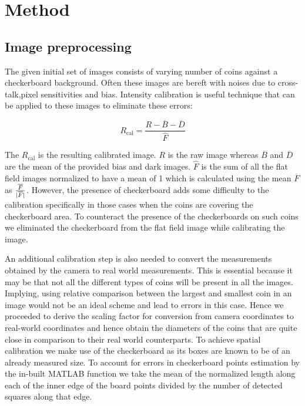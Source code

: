 \documentclass[report.tex]{subfile}
\begin{document}
\section{Method}

\subsection{Image preprocessing}
The given initial set of images consists of varying number of coins against a
checkerboard background. Often these images are bereft with noises due to
cross-talk,pixel sensitivities and bias. Intensity calibration is useful
technique that can be applied to these images to eliminate these errors:

\begin{equation*}
    R_{\textrm{cal}} = \frac{R - \overline{B} - \overline{D}}{\hat{F}}
\end{equation*}

The $R_{\textrm{cal}}$ is the resulting calibrated image. $R$ is the raw image
whereas $\overline{B}$ and $\overline{D}$ are the mean of the provided bias and
dark images. $\hat{F}$ is the sum of all the flat field images normalized to
have a mean of 1 which is calculated using the mean $\overline{F}$ as
$\frac{\overline{F}}{\lvert\overline{F}\rvert}$. However, the presence of
checkerboard adds some difficulty to the calibration specifically in those
cases when the coins are covering the checkerboard area. To counteract the
presence of the checkerboards on such coins we eliminated the checkerboard from
the flat field image while calibrating the image.

An additional calibration step is also needed to convert the measurements
obtained by the camera to real world measurements. This is essential because it
may be that not all the different types of coins will be present in all the
images. Implying, using relative comparison between the largest and smallest
coin in an image would not be an ideal scheme and lead to errors in this case.
Hence we proceeded to derive the scaling factor for conversion from camera
coordinates to real-world coordinates and hence obtain the diameters of the
coins that are quite close in comparison to their real world counterparts. To
achieve spatial calibration we make use of the checkerboard as its boxes are
known to be of an already measured size. To account for errors in checkerboard
points estimation by the in-built MATLAB function we take the mean of the
normalized length along each of the inner edge of the board points divided by
the number of detected squares along that edge.
\end{document}
